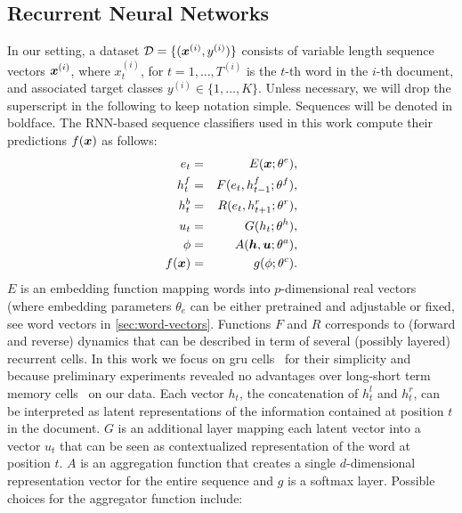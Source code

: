 \subsection{Recurrent Neural Networks}
\label{sec:rnn}
In our setting, a dataset $\mathcal{D}=\{(\bm{x}^{(i)},y^{(i)})\}$
consists of variable length sequence vectors $\bm{x}^{(i)}$, where
$x^{(i)}_t$, for $t=1,\dots,T^{(i)}$ is the $t$-th word in the $i$-th
document, and associated target classes
$y^{(i)}\in\{1,\dots,K\}$. Unless necessary, we will drop the
superscript in the following to keep notation simple.  Sequences will
be denoted in boldface. The RNN-based sequence classifiers used in
this work compute their predictions $f(\bm{x})$ as follows:
\begin{align}
  e_t &=& E(\bm{x};\theta^e),\label{eq:embed}\\
  h^f_t &=& F(e_t,h^f_{t-1};\theta^f),\label{eq:maxModelRL}\\  
  h^b_t &=& R(e_t,h^r_{t+1};\theta^r),\label{eq:maxModelRR}\\
  u_t &=& G(h_t;\theta^h),\label{eq:maxModelF}\\
  \phi & =& A(\bm{h},\bm{u};\theta^a),\label{eq:aggregation}\\
  f(\bm{x}) &=& g(\phi;\theta^c).\label{eq:maxModelC}
\end{align}
$E$ is an embedding function mapping words into $p$-dimensional real
vectors (where embedding parameters $\theta_e$ can be either
pretrained and adjustable or fixed, see word vectors in \cref{sec:word-vectors}.
Functions $F$ and $R$ corresponds to (forward and reverse)
dynamics that can be described in term of several (possibly layered)
recurrent cells. In this work we focus on \ac{gru}
cells~\cite{cho2014properties} for their simplicity and because
preliminary experiments revealed no advantages over long-short term
memory cells~\cite{hochreiter1997long} on our data. Each vector $h_t$,
the concatenation of $h^l_t$ and $h^r_t$, can be interpreted as latent
representations of the information contained at position $t$ in the
document. $G$ is an additional layer mapping each latent vector into a
vector $u_t$ that can be seen as contextualized representation of the
word at position $t$. $A$ is an aggregation function that creates a
single $d$-dimensional representation vector for the entire sequence
and $g$ is a softmax layer. Possible choices for the aggregator
function include:
